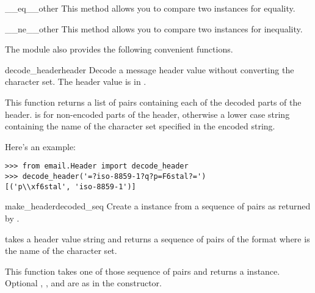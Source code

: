 \begin{methoddesc}[Header]{__eq__}{other}
This method allows you to compare two  instances for equality.
\end{methoddesc}

\begin{methoddesc}[Header]{__ne__}{other}
This method allows you to compare two  instances for inequality.
\end{methoddesc}

The  module also provides the following
convenient functions.

\begin{funcdesc}{decode_header}{header}
Decode a message header value without converting the character set.
The header value is in .

This function returns a list of  pairs
containing each of the decoded parts of the header.   is
 for non-encoded parts of the header, otherwise a lower
case string containing the name of the character set specified in the
encoded string.

Here's an example:

\begin{verbatim}
>>> from email.Header import decode_header
>>> decode_header('=?iso-8859-1?q?p=F6stal?=')
[('p\\xf6stal', 'iso-8859-1')]
\end{verbatim}
\end{funcdesc}

\begin{funcdesc}{make_header}{decoded_seq}
Create a  instance from a sequence of pairs as returned
by .

 takes a header value string and returns a
sequence of pairs of the format  where
 is the name of the character set.

This function takes one of those sequence of pairs and returns a
 instance.  Optional ,
, and  are as in the
 constructor.
\end{funcdesc}
